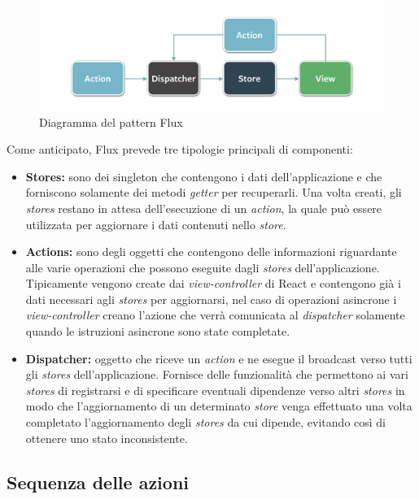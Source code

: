 \begin{figure}[htp]
\centering
\includegraphics[width=\textwidth*3/4]{../immagini/flux-simple}
\caption{Diagramma del pattern Flux}  
\end{figure}
\FloatBarrier

Come anticipato, Flux prevede tre tipologie principali di componenti:
\begin{itemize}
\item \textbf{Stores:} sono dei \gls{singleton} che contengono i dati dell'applicazione e che forniscono solamente dei metodi \textit{getter} per recuperarli. Una volta creati, gli \textit{stores} restano in attesa dell'esecuzione di un \textit{action}, la quale può essere utilizzata per aggiornare i dati contenuti nello \textit{store}.
\item \textbf{Actions:} sono degli oggetti che contengono delle informazioni riguardante alle varie operazioni che possono eseguite dagli \textit{stores} dell'applicazione. Tipicamente vengono create dai \textit{view-controller} di React e contengono già i dati necessari agli \textit{stores} per aggiornarsi, nel caso di operazioni asincrone i \textit{view-controller} creano l'azione che verrà comunicata al \textit{dispatcher} solamente quando le istruzioni asincrone sono state completate.
\item \textbf{Dispatcher:} oggetto che riceve un \textit{action} e ne esegue il broadcast verso tutti gli \textit{stores} dell'applicazione. Fornisce delle funzionalità che permettono ai vari \textit{stores} di registrarsi e di specificare eventuali dipendenze verso altri \textit{stores} in modo che l'aggiornamento di un determinato \textit{store} venga effettuato una volta completato l'aggiornamento degli \textit{stores} da cui dipende, evitando così di ottenere uno stato inconsistente.
\end{itemize}


\subsection{Sequenza delle azioni}

